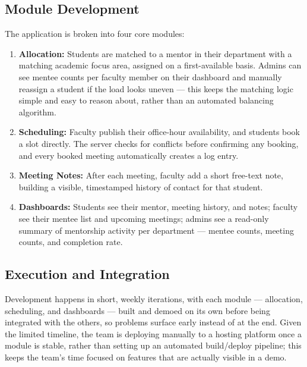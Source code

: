\documentclass[11pt]{article}
\begin{document}
\subsection{Module Development}
The application is broken into four core modules:
\begin{enumerate}[leftmargin=1.4em, itemsep=0.2em]
  \item \textbf{Allocation:} Students are matched to a mentor in their department with a matching academic focus area, assigned on a first-available basis. Admins can see mentee counts per faculty member on their dashboard and manually reassign a student if the load looks uneven --- this keeps the matching logic simple and easy to reason about, rather than an automated balancing algorithm.
  \item \textbf{Scheduling:} Faculty publish their office-hour availability, and students book a slot directly. The server checks for conflicts before confirming any booking, and every booked meeting automatically creates a log entry.
  \item \textbf{Meeting Notes:} After each meeting, faculty add a short free-text note, building a visible, timestamped history of contact for that student.
  \item \textbf{Dashboards:} Students see their mentor, meeting history, and notes; faculty see their mentee list and upcoming meetings; admins see a read-only summary of mentorship activity per department --- mentee counts, meeting counts, and completion rate.
\end{enumerate}

\subsection{Execution and Integration}
Development happens in short, weekly iterations, with each module --- allocation, scheduling, and dashboards --- built and demoed on its own before being integrated with the others, so problems surface early instead of at the end. Given the limited timeline, the team is deploying manually to a hosting platform once a module is stable, rather than setting up an automated build/deploy pipeline; this keeps the team's time focused on features that are actually visible in a demo.
\end{document}
